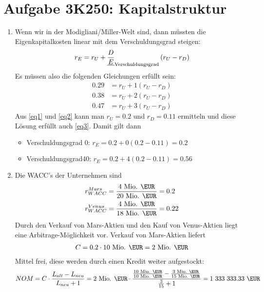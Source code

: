\documentclass{article}
\begin{document}
	\section*{Aufgabe 3K250: Kapitalstruktur}
	\begin{enumerate}[label=(\alph*)]
		\item Wenn wir in der Modigliani/Miller-Welt sind, dann müssten die Eigenkapitalkosten linear mit dem Verschuldungsgrad steigen:
		\begin{align}
			r_E = r_U + \underline{\frac{D}{E}}_{\text{Verschuldungsgrad}}\left(r_U-r_D\right) \notag
		\end{align}
		Es müssen also die folgenden Gleichungen erfüllt sein:
		\begin{align}
			\label{eq1} 0.29 &= r_U + 1\left(r_U-r_D\right) \\
			\label{eq2} 0.38 &= r_U + 2\left(r_U-r_D\right) \\
			\label{eq3} 0.47 &= r_U + 3\left(r_U-r_D\right)
		\end{align}
		Aus \eqref{eq1} und \eqref{eq2} kann man $r_U=0.2$ und $r_D=0.11$ ermitteln und diese Lösung erfüllt auch \eqref{eq3}. Damit gilt dann
		\begin{itemize}
			\item Verschuldungsgrad 0: $r_E=0.2 + 0(0.2-0.11)=0.2$
			\item Verschuldungsgrad40: $r_E=0.2 + 4(0.2-0.11)=0.56$
		\end{itemize}
		\item Die WACC's der Unternehmen sind
		\begin{align}
			r_{WACC}^{Mars} &= \frac{4\text{ Mio. \EUR}}{20\text{ Mio. \EUR}} = 0.2 \notag \\
			r_{WACC}^{Venus} &= \frac{4\text{ Mio. \EUR}}{18\text{ Mio. \EUR}} = 0.22 \notag
		\end{align}
		Durch den Verkauf von Mars-Aktien und den Kauf von Venus-Aktien liegt eine Arbitrage-Möglichkeit vor. Verkauf von Mars-Aktien liefert
		\begin{align}
			C = 0.2\cdot 10\text{ Mio. \EUR} = 2 \text{ Mio. \EUR} \notag
		\end{align}
		Mittel frei, diese werden durch einen Kredit weiter aufgestockt:
		\begin{align}
			NOM = C\cdot\frac{L_{alt}-L_{neu}}{L_{neu} + 1} = 2\text{ Mio. \EUR}\cdot\frac{\frac{10 \text{ Mio. \EUR}}{10\text{ Mio. \EUR}}-\frac{3\text{ Mio. \EUR}}{15\text{ Mio. \EUR}}}{\frac{3}{15}+1} = \text{1 333 333.33 \EUR} \notag
		\end{align}

\end{enumerate}
\end{document}
